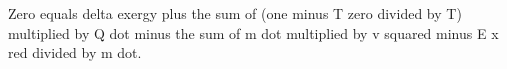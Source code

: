 Zero equals delta exergy plus the sum of (one minus T zero divided by T) multiplied by Q dot minus the sum of m dot multiplied by v squared minus E x red divided by m dot.